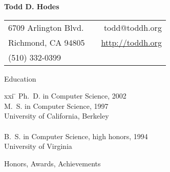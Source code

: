 \setlength{\oddsidemargin}{0.25 in}
\setlength{\evensidemargin}{-0.25 in}
\setlength{\topmargin}{-0.95 in}
\setlength{\textwidth}{6.5 in}
\setlength{\textheight}{10 in}
\setlength{\headsep}{0.35 in}
\setlength{\parindent}{0 in}
\setlength{\parskip}{0.01 in}


\addtolength{\evensidemargin}{-15pt}
\addtolength{\oddsidemargin}{-15pt}

\pagestyle{empty}


\begin{center} \bf
\Large
                               Todd D. Hodes
\medskip
\normalsize


\begin{tabular}{lp{3.75in}r}
6709 Arlington Blvd.  & & todd@toddh.org \\
Richmond, CA  94805 & & \url{http://toddh.org} \\
(510)  332-0399 \\
\end{tabular}

\end{center}

\bigskip


\begin{bf} \large
Education \\[-18pt]
\end{bf}

\begin{tabbing}
xxi \= \kill
\>   Ph.\ D. in Computer Science, 2002 \\
\>   M.\ S. in  Computer Science, 1997 \\
\>   University of California, Berkeley \\
\smallskip \\[-6pt]
\>   B.\ S. in Computer Science, high honors, 1994 \\
\>   University of Virginia \\
\end{tabbing}

\begin{bf} \large
Honors, Awards, Achievements  \\[-16pt]
\end{bf}

